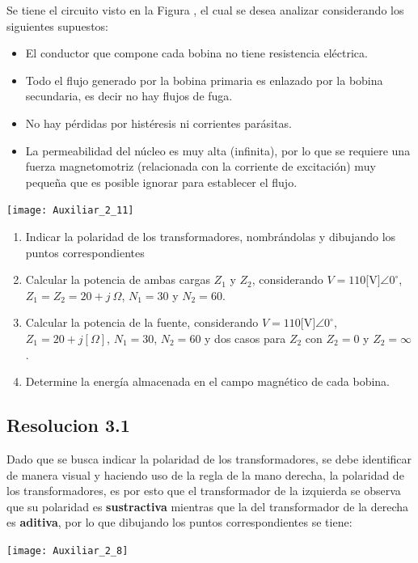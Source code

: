 \documentclass[
  11pt,
  letterpaper,
   addpoints,
   answers
  ]{exam}
\begin{document}
\begin{questions}
\question Se tiene el circuito visto en la Figura , el cual se desea analizar considerando los siguientes supuestos:
\begin{itemize}
    \item El conductor que compone cada bobina no tiene resistencia eléctrica.
    \item Todo el flujo generado por la bobina primaria es enlazado por la bobina secundaria, es decir no hay flujos de fuga.
    \item No hay pérdidas por histéresis ni corrientes parásitas.
    \item La permeabilidad del núcleo es muy alta (infinita), por lo que se requiere una fuerza magnetomotriz (relacionada con la corriente de excitación) muy pequeña que es posible ignorar para establecer el flujo.
\end{itemize}
\begin{center}
    \texttt{[image: Auxiliar\_2\_11]}
\end{center}
\begin{enumerate}
    \item Indicar la polaridad de los transformadores, nombrándolas y dibujando los puntos
    correspondientes
    \item Calcular la potencia de ambas cargas \( Z_1 \) y \( Z_2 \), considerando \( V = 110\text{[V]}\angle 0^{\circ} \), \( Z_1 = Z_2 = 20 + j\ \Omega \), \( N_1 = 30 \) y \( N_2 = 60 \).
    \item  Calcular la potencia de la fuente, considerando \( V = 110\text{[V]}\angle 0^\circ \), \( Z_1 = 20 + j[ \Omega] \), \( N_1 = 30 \), \( N_2 = 60 \) y dos casos para \( Z_2 \) con \( Z_2 = 0 \) y \( Z_2 = \infty \).
    \item Determine la energía almacenada en el campo magnético de cada bobina.
\end{enumerate}

\begin{solution}
    \subsection*{Resolucion 3.1}
    Dado que se busca indicar la polaridad de los transformadores, se debe identificar de manera visual y haciendo uso de la regla de la mano derecha, la polaridad de los transformadores, es por esto que el transformador de la izquierda se observa que su polaridad es \textbf{sustractiva} mientras que la del transformador de la derecha es \textbf{aditiva}, por lo que dibujando los puntos correspondientes se tiene:
    \begin{center}
        \texttt{[image: Auxiliar\_2\_8]}
    \end{center}

\end{solution}
\end{questions}
\end{document}

